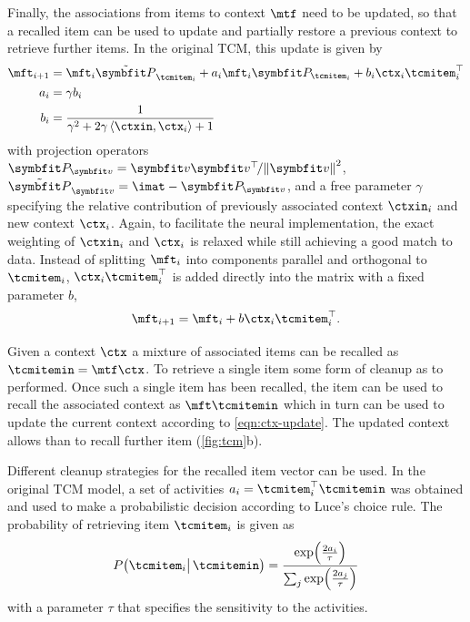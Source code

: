 Finally, the associations from items to context $\mtf$ need to be updated, so that a recalled item can be used to update and partially restore a previous context to retrieve further items.
In the original TCM, this update is given by
\begin{align}
    \mft_{i+1} &= \mft_i \tilde{\mat{P}}_{\tcmitem_i} + a_i \mft_i \mat{P}_{\tcmitem_i} + b_i \ctx_i \tcmitem_i\Tr \\
    a_i &= \gamma b_i \\
    b_i &= \frac{1}{\gamma^2 + 2 \gamma \left\langle\ctxin, \ctx_i\right\rangle + 1}
\end{align}
with projection operators $\mat{P}_{\vc v} = \vc v \vc v\Tr\!/ \norm{\vc v}^2$, $\tilde{\mat{P}}_{\vc v} = \imat - \mat{P}_{\vc v}$, and a free parameter $\gamma$ specifying the relative contribution of previously associated context $\ctxin_i$ and new context $\ctx_i$.
Again, to facilitate the neural implementation, the exact weighting of $\ctxin_i$ and $\ctx_i$ is relaxed while still achieving a good match to data.
Instead of splitting $\mft_i$ into components parallel and orthogonal to $\tcmitem_i$, $\ctx_i\tcmitem_i\Tr$ is added directly into the matrix with a fixed parameter $b$,
\begin{equation}
    \mft_{i+1} = \mft_i + b \ctx_i\tcmitem_i\Tr\text{.}
\end{equation}

Given a context $\ctx$ a mixture of associated items can be recalled as $\tcmitemin = \mtf \ctx$.
To retrieve a single item some form of cleanup as to performed.
Once such a single item has been recalled, the item can be used to recall the associated context as $\mft \tcmitemin$ which in turn can be used to update the current context according to \cref{eqn:ctx-update}.
The updated context allows than to recall further item (\cref{fig:tcm}b).

Different cleanup strategies for the recalled item vector can be used.
In the original TCM model, a set of activities $a_i = \tcmitem_i\Tr \tcmitemin$ was obtained and used to make a probabilistic decision according to Luce's choice rule.
The probability of retrieving item $\tcmitem_i$ is given as
\begin{equation}
    P\bigl(\tcmitem_i \bigl|\,\tcmitemin\bigr) = \frac{\exp\!\del{\frac{2a_i}{\tau}}}{\sum_j \exp\!\del{\frac{2a_j}{\tau}}}
\end{equation}
with a parameter $\tau$ that specifies the sensitivity to the activities.

